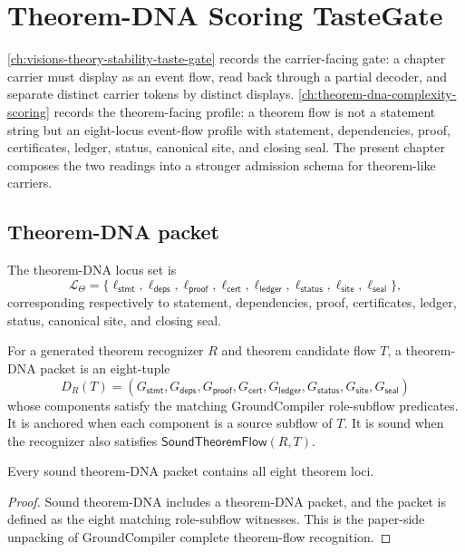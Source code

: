 \chapter{Theorem-DNA Scoring TasteGate}
\label{ch:theorem-dna-scoring-taste-gate}

\autoref{ch:visions-theory-stability-taste-gate} records the carrier-facing
gate: a chapter carrier must display as an event flow, read back through a
partial decoder, and separate distinct carrier tokens by distinct displays.
\autoref{ch:theorem-dna-complexity-scoring} records the theorem-facing
profile: a theorem flow is not a statement string but an eight-locus event-flow
profile with statement, dependencies, proof, certificates, ledger, status,
canonical site, and closing seal. The present chapter composes the two
readings into a stronger admission schema for theorem-like carriers.

\section{Theorem-DNA packet}
\label{sec:tdcs-theorem-dna-packet}

\begin{definition}
\label{def:tdcs-theorem-locus-set}
The theorem-DNA locus set is
$$
\mathcal L_{\Theta}=
\{\ell_{\mathsf{stmt}},\ell_{\mathsf{deps}},\ell_{\mathsf{proof}},
\ell_{\mathsf{cert}},\ell_{\mathsf{ledger}},\ell_{\mathsf{status}},
\ell_{\mathsf{site}},\ell_{\mathsf{seal}}\},
$$
corresponding respectively to statement, dependencies, proof, certificates,
ledger, status, canonical site, and closing seal.
\end{definition}

\begin{definition}
\label{def:tdcs-theorem-dna-packet}
For a generated theorem recognizer $R$ and theorem candidate flow $T$, a
theorem-DNA packet is an eight-tuple
$$
D_R(T)=
(G_{\mathsf{stmt}},G_{\mathsf{deps}},G_{\mathsf{proof}},
G_{\mathsf{cert}},G_{\mathsf{ledger}},G_{\mathsf{status}},
G_{\mathsf{site}},G_{\mathsf{seal}})
$$
whose components satisfy the matching GroundCompiler role-subflow predicates.
It is anchored when each component is a source subflow of $T$. It is sound when
the recognizer also satisfies $\mathsf{SoundTheoremFlow}(R,T)$.
\end{definition}

\begin{theorem}
\label{thm:tdcs-sound-dna-role-complete}
Every sound theorem-DNA packet contains all eight theorem loci.
\end{theorem}
\begin{proof}
Sound theorem-DNA includes a theorem-DNA packet, and the packet is defined as
the eight matching role-subflow witnesses. This is the paper-side unpacking of
GroundCompiler complete theorem-flow recognition.
\end{proof}

